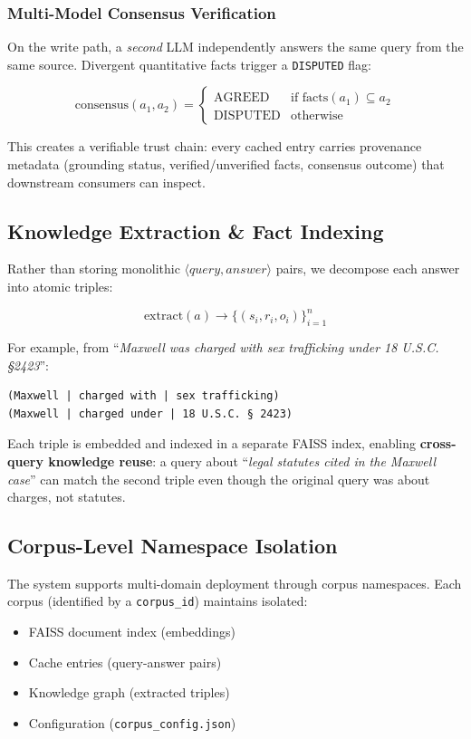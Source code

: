 \documentclass[11pt,twocolumn]{article}
\begin{document}
\subsubsection{Multi-Model Consensus Verification}

On the write path, a \textit{second} LLM independently answers the same query from the same source. Divergent quantitative facts trigger a \texttt{DISPUTED} flag:

$$\text{consensus}(a_1, a_2) = \begin{cases}
\text{AGREED} & \text{if } \text{facts}(a_1) \subseteq a_2 \\
\text{DISPUTED} & \text{otherwise}
\end{cases}$$

This creates a verifiable trust chain: every cached entry carries provenance metadata (grounding status, verified/unverified facts, consensus outcome) that downstream consumers can inspect.

\subsection{Knowledge Extraction \& Fact Indexing}
\label{sec:knowledge}

Rather than storing monolithic $\langle query, answer \rangle$ pairs, we decompose each answer into atomic triples:

$$\text{extract}(a) \to \{(s_i, r_i, o_i)\}_{i=1}^{n}$$

For example, from ``\textit{Maxwell was charged with sex trafficking under 18 U.S.C. \S 2423}'':

\begin{small}
\begin{verbatim}
(Maxwell | charged with | sex trafficking)
(Maxwell | charged under | 18 U.S.C. § 2423)
\end{verbatim}
\end{small}

Each triple is embedded and indexed in a separate FAISS index, enabling \textbf{cross-query knowledge reuse}: a query about ``\textit{legal statutes cited in the Maxwell case}'' can match the second triple even though the original query was about charges, not statutes.

\subsection{Corpus-Level Namespace Isolation}
\label{sec:corpus}

The system supports multi-domain deployment through corpus namespaces. Each corpus (identified by a \texttt{corpus\_id}) maintains isolated:
\begin{itemize}
    \item FAISS document index (embeddings)
    \item Cache entries (query-answer pairs)
    \item Knowledge graph (extracted triples)
    \item Configuration (\texttt{corpus\_config.json})
\end{itemize}
\end{document}
